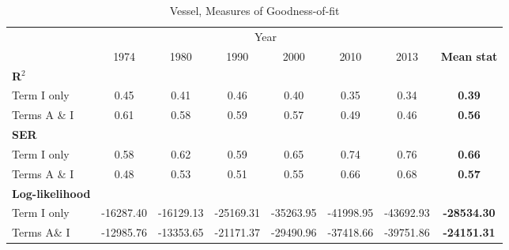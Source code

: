 \documentclass[a4paper,11pt]{article}
\begin{document}
\begin{table}[htbp]
  \centering
  \caption{Vessel, Measures of Goodness-of-fit}
\begin{center}
    \begin{tabular}{lccccccc}
   \hline\hline
          & \multicolumn{6}{c}{Year}                      &  \\
          & 1974  & 1980  & 1990  & 2000  & 2010  & 2013  & \textbf{Mean stat} \\
\hline
\textbf{R$^{2}$}\unboldmath{} & \multicolumn{1}{c}{} & \multicolumn{1}{c}{} & \multicolumn{1}{c}{} & \multicolumn{1}{c}{} & \multicolumn{1}{c}{} &       &  \\
Term I only & \multicolumn{1}{c}{0.45} & \multicolumn{1}{c}{0.41} & \multicolumn{1}{c}{0.46} & \multicolumn{1}{c}{0.40} & \multicolumn{1}{c}{0.35} & \multicolumn{1}{c}{0.34} & \multicolumn{1}{c}{\textbf{0.39}} \\
Terms A \& I & \multicolumn{1}{c}{0.61} & \multicolumn{1}{c}{0.58} & \multicolumn{1}{c}{0.59} & \multicolumn{1}{c}{0.57} & \multicolumn{1}{c}{0.49} & \multicolumn{1}{c}{0.46} & \multicolumn{1}{c}{\textbf{0.56}} \\
\textbf{SER} &       &       & \multicolumn{1}{c}{} & \multicolumn{1}{c}{} & \multicolumn{1}{c}{} & \multicolumn{1}{c}{} & \multicolumn{1}{c}{\textbf{}} \\
Term I only & \multicolumn{1}{c}{0.58} & \multicolumn{1}{c}{0.62} & \multicolumn{1}{c}{0.59} & \multicolumn{1}{c}{0.65} & \multicolumn{1}{c}{0.74} & \multicolumn{1}{c}{0.76} & \multicolumn{1}{c}{\textbf{0.66}} \\
Terms A \& I & \multicolumn{1}{c}{0.48} & \multicolumn{1}{c}{0.53} & \multicolumn{1}{c}{0.51} & \multicolumn{1}{c}{0.55} & \multicolumn{1}{c}{0.66} & \multicolumn{1}{c}{0.68} & \multicolumn{1}{c}{\textbf{0.57}} \\
\textbf{Log-likelihood} & \multicolumn{1}{c}{} & \multicolumn{1}{c}{} & \multicolumn{1}{c}{} & \multicolumn{1}{c}{} &       & \multicolumn{1}{c}{} & \multicolumn{1}{c}{\textbf{}} \\
Term I only & \multicolumn{1}{c}{-16287.40} & \multicolumn{1}{c}{-16129.13} & \multicolumn{1}{c}{-25169.31} & \multicolumn{1}{c}{-35263.95} & \multicolumn{1}{c}{-41998.95} & \multicolumn{1}{c}{-43692.93} & \multicolumn{1}{c}{\textbf{-28534.30}} \\
Terms A\& I & \multicolumn{1}{c}{-12985.76} & \multicolumn{1}{c}{-13353.65} & \multicolumn{1}{c}{-21171.37} & \multicolumn{1}{c}{-29490.96} & \multicolumn{1}{c}{-37418.66} & \multicolumn{1}{c}{-39751.86} & \multicolumn{1}{c}{\textbf{-24151.31}} \\

\end{tabular}
\end{center}
\end{table}
\end{document}
